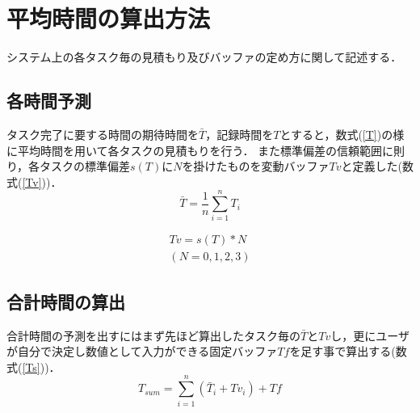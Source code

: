 \documentclass[submit,techrep,noauthor]{ipsj}
\begin{document}
\section{平均時間の算出方法}
システム上の各タスク毎の見積もり及びバッファの定め方に関して記述する．
\subsection{各時間予測}
タスク完了に要する時間の期待時間を$\bar{T}$，記録時間を$T$とすると，数式(\ref{T})の様に平均時間を用いて各タスクの見積もりを行う．
また標準偏差の信頼範囲に則り，各タスクの標準偏差$s(T)$に$N$を掛けたものを変動バッファ$Tv$と定義した(数式(\ref{Tv}))．
\begin{equation}
\label{T}
\bar{T}=\frac{1}{n}\displaystyle\sum_{i=1}^{n}T_{i}
\end{equation}

\begin{eqnarray}
\label{Tv}
Tv=s(T)*N \\
(N= 0, 1,2, 3 )\nonumber
\end{eqnarray}

\subsection{合計時間の算出}

合計時間の予測を出すにはまず先ほど算出したタスク毎の$\bar{T}$と$Tv$し，更にユーザが自分で決定し数値として入力ができる固定バッファ$Tf$を足す事で算出する(数式(\ref{Ts}))．
\begin{equation}
\label{Ts}
T_{sum}= \displaystyle\sum_{i=1}^{n} (\bar{T}_{i} + Tv_{i})+Tf
\end{equation}
\end{document}
